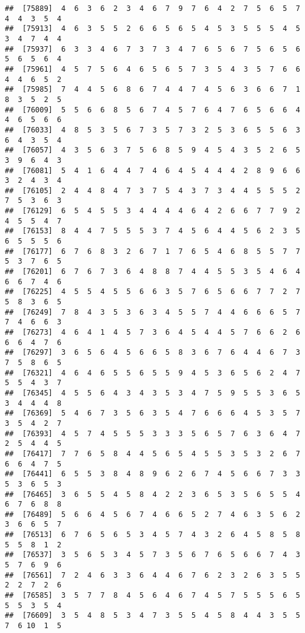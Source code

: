 \documentclass[
]{book}
\begin{document}
\begin{verbatim}
##  [75889]  4  6  3  6  2  3  4  6  7  9  7  6  4  2  7  5  6  5  7  4  4  3  5  4
##  [75913]  4  6  3  5  5  2  6  6  5  6  5  4  5  3  5  5  5  4  5  3  4  7  4  4
##  [75937]  6  3  3  4  6  7  3  7  3  4  7  6  5  6  7  5  6  5  6  5  6  5  6  4
##  [75961]  4  5  7  5  6  4  6  5  6  5  7  3  5  4  3  5  7  6  6  4  4  6  5  2
##  [75985]  7  4  4  5  6  8  6  7  4  4  7  4  5  6  3  6  6  7  1  8  3  5  2  5
##  [76009]  5  5  6  6  8  5  6  7  4  5  7  6  4  7  6  5  6  6  4  4  6  5  6  6
##  [76033]  4  8  5  3  5  6  7  3  5  7  3  2  5  3  6  5  5  6  3  6  4  3  5  4
##  [76057]  4  3  5  6  3  7  5  6  8  5  9  4  5  4  3  5  2  6  5  3  9  6  4  3
##  [76081]  5  4  1  6  4  4  7  4  6  4  5  4  4  4  2  8  9  6  6  3  2  4  3  4
##  [76105]  2  4  4  8  4  7  3  7  5  4  3  7  3  4  4  5  5  5  2  7  5  3  6  3
##  [76129]  6  5  4  5  5  3  4  4  4  4  6  4  2  6  6  7  7  9  2  4  5  5  4  7
##  [76153]  8  4  4  7  5  5  5  3  7  4  5  6  4  4  5  6  2  3  5  6  5  5  5  6
##  [76177]  6  7  6  8  3  2  6  7  1  7  6  5  4  6  8  5  5  7  7  5  3  7  6  5
##  [76201]  6  7  6  7  3  6  4  8  8  7  4  4  5  5  3  5  4  6  4  6  6  7  4  6
##  [76225]  4  5  5  4  5  5  6  6  3  5  7  6  5  6  6  7  7  2  7  5  8  3  6  5
##  [76249]  7  8  4  3  5  3  6  3  4  5  5  7  4  4  6  6  6  5  7  7  4  6  6  3
##  [76273]  4  6  4  1  4  5  7  3  6  4  5  4  4  5  7  6  6  2  6  6  6  4  7  6
##  [76297]  3  6  5  6  4  5  6  6  5  8  3  6  7  6  4  4  6  7  3  7  5  8  6  5
##  [76321]  4  6  4  6  5  5  6  5  5  9  4  5  3  6  5  6  2  4  7  5  5  4  3  7
##  [76345]  4  5  5  6  4  3  4  3  5  3  4  7  5  9  5  5  3  6  5  3  4  4  4  8
##  [76369]  5  4  6  7  3  5  6  3  5  4  7  6  6  6  4  5  3  5  7  3  5  4  2  7
##  [76393]  4  5  7  4  5  5  5  3  3  3  5  6  5  7  6  3  6  4  7  2  5  4  4  5
##  [76417]  7  7  6  5  8  4  4  5  6  5  4  5  5  3  5  3  2  6  7  6  6  4  7  5
##  [76441]  6  5  5  3  8  4  8  9  6  2  6  7  4  5  6  6  7  3  3  5  3  6  5  3
##  [76465]  3  6  5  5  4  5  8  4  2  2  3  6  5  3  5  6  5  5  4  6  7  6  8  8
##  [76489]  5  6  6  4  5  6  7  4  6  6  5  2  7  4  6  3  5  6  2  3  6  6  5  7
##  [76513]  6  7  6  5  6  5  3  4  5  7  4  3  2  6  4  5  8  5  8  5  5  8  1  2
##  [76537]  3  5  6  5  3  4  5  7  3  5  6  7  6  5  6  6  7  4  3  5  7  6  9  6
##  [76561]  7  2  4  6  3  3  6  4  4  6  7  6  2  3  2  6  3  5  5  2  2  7  2  6
##  [76585]  3  5  7  7  8  4  5  6  4  6  7  4  5  7  5  5  5  6  5  5  5  3  5  4
##  [76609]  3  5  4  8  5  3  4  7  3  5  5  4  5  8  4  4  3  5  5  7  6 10  1  5

\end{verbatim}
\end{document}

